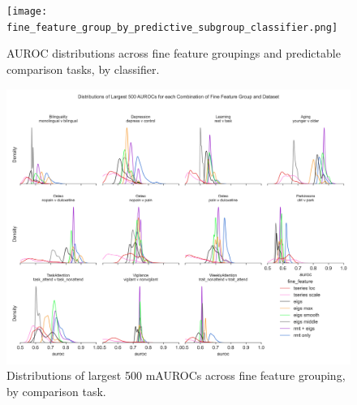 \documentclass{article}  %
\begin{document}
\begin{figure}[H]
\begin{center}
\texttt{[image: fine\_feature\_group\_by\_predictive\_subgroup\_classifier.png]}
\end{center}
\caption
{ \label{fig:fine-classifier}
AUROC distributions across fine feature groupings and predictable comparison tasks, by classifier.}
\end{figure}



\begin{figure}[H]
\begin{center}
\includegraphics[width=\textwidth,height=0.9\textheight,keepaspectratio]{fine_feature_largest_by_subgroup.png}
\end{center}
\caption
{ \label{fig:fine-largest}
Distributions of largest 500 mAUROCs across fine feature grouping, by comparison task.}
\end{figure}
\end{document}
